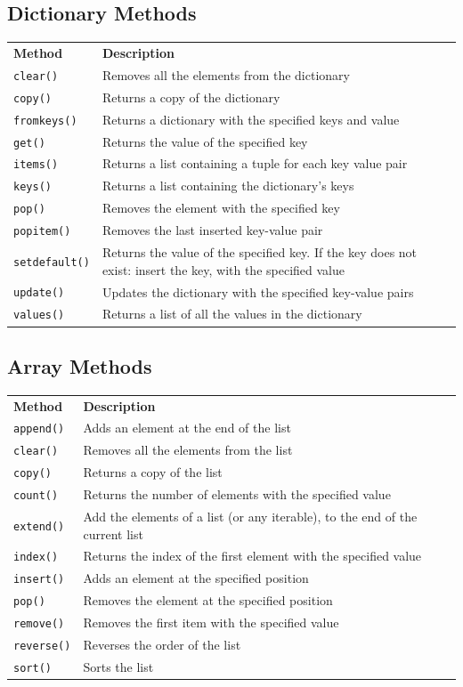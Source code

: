\documentclass[12pt,a4paper]{article}
\newcommand{\lcode}[1]{%
	\lstinline{#1}%
}
\newcommand{\tcol}[2]{%
	\quad #1 & #2 \\
}
\begin{document}
\subsection{Dictionary Methods}\label{pyDictionaryMethod}

\begin{table}[h]
	\begin{center}
		\begin{tabularx}{\textwidth}{lXl}
\tcol{\textbf{Method}}{\textbf{Description}}
\tcol{\lcode{clear()}}{Removes all the elements from the dictionary}
\tcol{\lcode{copy()}}{Returns a copy of the dictionary}
\tcol{\lcode{fromkeys()}}{Returns a dictionary with the specified keys and value}
\tcol{\lcode{get()}}{Returns the value of the specified key}
\tcol{\lcode{items()}}{Returns a list containing a tuple for each key value pair}
\tcol{\lcode{keys()}}{Returns a list containing the dictionary's keys}
\tcol{\lcode{pop()}}{Removes the element with the specified key}
\tcol{\lcode{popitem()}}{Removes the last inserted key-value pair}
\tcol{\lcode{setdefault()}}
	{Returns the value of the specified key. If the key does not exist: insert
	the key, with the specified value}
\tcol{\lcode{update()}}{Updates the dictionary with the specified key-value pairs}
\tcol{\lcode{values()}}{Returns a list of all the values in the dictionary}
		\end{tabularx}
	\end{center}
\end{table}
\subsection{Array Methods}\label{pyArrayMethod}

\begin{table}[h]
	\begin{center}
		\begin{tabularx}{.8\textwidth}{lXl}
			\tcol{\textbf{Method}}{\textbf{Description}}
\tcol{\lcode{append()}}{Adds an element at the end of the list}
\tcol{\lcode{clear()}}{Removes all the elements from the list}
\tcol{\lcode{copy()}}{Returns a copy of the list}
\tcol{\lcode{count()}}{Returns the number of elements with the specified value}
\tcol{\lcode{extend()}}{Add the elements of a list (or any iterable), to the end of the current list}
\tcol{\lcode{index()}}{Returns the index of the first element with the specified value}
\tcol{\lcode{insert()}}{Adds an element at the specified position}
\tcol{\lcode{pop()}}{Removes the element at the specified position}
\tcol{\lcode{remove()}}{Removes the first item with the specified value}
\tcol{\lcode{reverse()}}{Reverses the order of the list}
\tcol{\lcode{sort()}}{Sorts the list}
		\end{tabularx}
	\end{center}
\end{table}
\vfill\newpage
\end{document}

